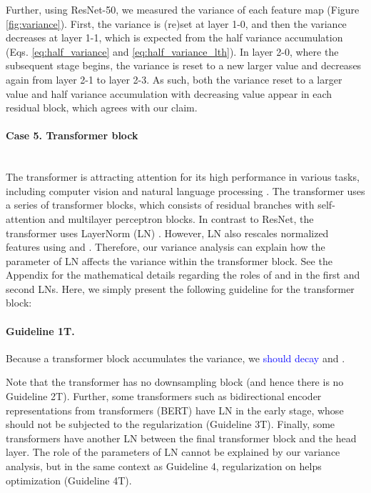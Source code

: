 \documentclass{article}
\begin{document}
Further, using ResNet-50, we measured the variance of each feature map (Figure \ref{fig:variance}). First, the variance is (re)set at layer 1-0, and then the variance decreases at layer 1-1, which is expected from the half variance accumulation (Eqs. \ref{eq:half_variance} and \ref{eq:half_variance_lth}). In layer 2-0, where the subsequent stage begins, the variance is reset to a new larger value and decreases again from layer 2-1 to layer 2-3. As such, both the variance reset to a larger value and half variance accumulation with decreasing value appear in each residual block, which agrees with our claim.

\paragraph{Case 5. Transformer block} \ \\
The transformer is attracting attention for its high performance in various tasks, including computer vision \cite{giclr/DosovitskiyB0WZ21} and natural language processing \cite{gnips/VaswaniSPUJGKP17,gnaacl/DevlinCLT19}. The transformer uses a series of transformer blocks, which consists of residual branches with self-attention and multilayer perceptron blocks. In contrast to ResNet, the transformer uses LayerNorm (LN) \cite{gcorr/BaKH16}. However, LN also rescales normalized features using  and . Therefore, our variance analysis can explain how the  parameter of LN affects the variance within the transformer block. See the Appendix for the mathematical details regarding the roles of  and  in the first and second LNs. Here, we simply present the following guideline for the transformer block:
\paragraph{Guideline 1T.}Because a transformer block accumulates the variance, we \textcolor{blue}{should decay}  and .

Note that the transformer has no downsampling block (and hence there is no Guideline 2T). Further, some transformers such as bidirectional encoder representations from transformers (BERT) \cite{gnaacl/DevlinCLT19} have LN in the early stage, whose  should not be subjected to the  regularization (Guideline 3T). Finally, some transformers \cite{gnips/VaswaniSPUJGKP17} have another LN between the final transformer block and the head layer. The role of the  parameters of LN cannot be explained by our variance analysis, but in the same context as Guideline 4,  regularization on  helps optimization (Guideline 4T).
\end{document}
